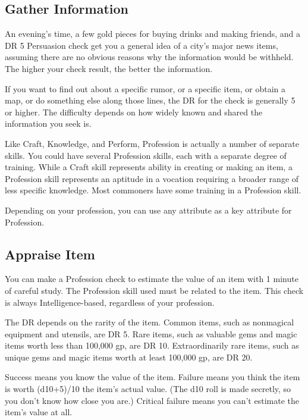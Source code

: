     \subsection{Gather Information}
        An evening's time, a few gold pieces for buying drinks and making friends, and a DR 5 Persuasion check get you a general idea of a city's major news items, assuming there are no obvious reasons why the information would be withheld. The higher your check result, the better the information.

        If you want to find out about a specific rumor, or a specific item, or obtain a map, or do something else along those lines, the DR for the check is generally 5 or higher.
        The difficulty depends on how widely known and shared the information you seek is.

\newpage
{}
        Like Craft, Knowledge, and Perform, Profession is actually a number of separate skills.
        You could have several Profession skills, each with a separate degree of training.
        While a Craft skill represents ability in creating or making an item, a Profession skill represents an aptitude in a vocation requiring a broader range of less specific knowledge.
        Most commoners have some training in a Profession skill.

        Depending on your profession, you can use any attribute as a key attribute for Profession.

    \subsection{Appraise Item}
        You can make a Profession check to estimate the value of an item with 1 minute of careful study. The Profession skill used must be related to the item.
        This check is always Intelligence-based, regardless of your profession.

        The DR depends on the rarity of the item. Common items, such as nonmagical equipment and utensils, are DR 5. Rare items, such as valuable gems and magic items worth less than 100,000 gp, are DR 10. Extraordinarily rare items, such as unique gems and magic items worth at least 100,000 gp, are DR 20.

        Success means you know the value of the item. Failure means you think the item is worth (d10+5)/10 \x the item's actual value. (The d10 roll is made secretly, so you don't know how close you are.) Critical failure means you can't estimate the item's value at all.


